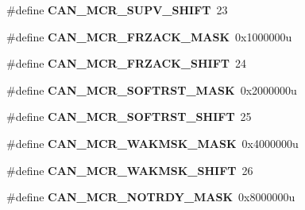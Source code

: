 \begin{DoxyCompactItemize}
\item 
\#define {\bfseries C\+A\+N\+\_\+\+M\+C\+R\+\_\+\+S\+U\+P\+V\+\_\+\+S\+H\+I\+FT}~23\hypertarget{group__CAN__Register__Masks_ga5a448e496f0243c035ddcb70b8a07c4e}{}\label{group__CAN__Register__Masks_ga5a448e496f0243c035ddcb70b8a07c4e}

\item 
\#define {\bfseries C\+A\+N\+\_\+\+M\+C\+R\+\_\+\+F\+R\+Z\+A\+C\+K\+\_\+\+M\+A\+SK}~0x1000000u\hypertarget{group__CAN__Register__Masks_gabec15eb427d7b249e72902c35bfc5f6e}{}\label{group__CAN__Register__Masks_gabec15eb427d7b249e72902c35bfc5f6e}

\item 
\#define {\bfseries C\+A\+N\+\_\+\+M\+C\+R\+\_\+\+F\+R\+Z\+A\+C\+K\+\_\+\+S\+H\+I\+FT}~24\hypertarget{group__CAN__Register__Masks_ga666c7d11b911c7803d94b85ba54a05c3}{}\label{group__CAN__Register__Masks_ga666c7d11b911c7803d94b85ba54a05c3}

\item 
\#define {\bfseries C\+A\+N\+\_\+\+M\+C\+R\+\_\+\+S\+O\+F\+T\+R\+S\+T\+\_\+\+M\+A\+SK}~0x2000000u\hypertarget{group__CAN__Register__Masks_gab9b1cfdb7014655d12f0a5ebafb3fc9b}{}\label{group__CAN__Register__Masks_gab9b1cfdb7014655d12f0a5ebafb3fc9b}

\item 
\#define {\bfseries C\+A\+N\+\_\+\+M\+C\+R\+\_\+\+S\+O\+F\+T\+R\+S\+T\+\_\+\+S\+H\+I\+FT}~25\hypertarget{group__CAN__Register__Masks_gadff8b8b1d5645fca57a02109df3e507b}{}\label{group__CAN__Register__Masks_gadff8b8b1d5645fca57a02109df3e507b}

\item 
\#define {\bfseries C\+A\+N\+\_\+\+M\+C\+R\+\_\+\+W\+A\+K\+M\+S\+K\+\_\+\+M\+A\+SK}~0x4000000u\hypertarget{group__CAN__Register__Masks_gac42f66e8828cd1923fee14d23ed99986}{}\label{group__CAN__Register__Masks_gac42f66e8828cd1923fee14d23ed99986}

\item 
\#define {\bfseries C\+A\+N\+\_\+\+M\+C\+R\+\_\+\+W\+A\+K\+M\+S\+K\+\_\+\+S\+H\+I\+FT}~26\hypertarget{group__CAN__Register__Masks_gac10449abdadabddb4aef81457dfb7449}{}\label{group__CAN__Register__Masks_gac10449abdadabddb4aef81457dfb7449}

\item 
\#define {\bfseries C\+A\+N\+\_\+\+M\+C\+R\+\_\+\+N\+O\+T\+R\+D\+Y\+\_\+\+M\+A\+SK}~0x8000000u\hypertarget{group__CAN__Register__Masks_ga013a34c0c5b808052d13ed4b9db2af75}{}\label{group__CAN__Register__Masks_ga013a34c0c5b808052d13ed4b9db2af75}


\end{DoxyCompactItemize}
